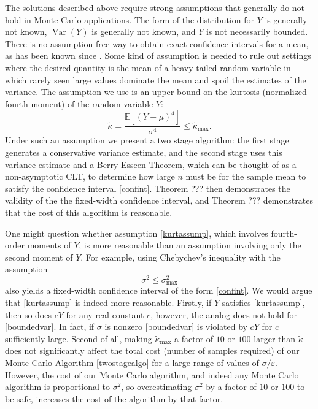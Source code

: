 \documentclass[graybox]{svmult}
\newcommand\e{\mathbb{E}}
\DeclareMathOperator{\var}{Var}
\newcommand{\tkappa}{\tilde{\kappa}}
\begin{document}
The solutions described above require strong assumptions that generally do not hold in Monte Carlo applications.  The form of the distribution for $Y$ is generally not known, $\var(Y)$ is generally not known, and $Y$ is not necessarily bounded.  There is no assumption-free way to obtain exact confidence intervals for a mean,
as has been known since \cite[Corollary 2]{BahSav56}. Some kind of assumption is needed to rule out settings where the desired quantity is the
mean of a heavy tailed random variable in which
rarely seen large values dominate the mean and spoil the estimates of the variance.
The assumption we use is an upper bound on
the kurtosis (normalized fourth moment) of the
random variable $Y$:
\begin{equation} \label{kurtassump}
\tkappa = \frac{\e[(Y-\mu)^4]}{\sigma^4} \le \tkappa_{\max}.
\end{equation}
Under such an assumption we present
a two stage algorithm: the first stage generates
a conservative variance estimate, and the second stage
uses this variance estimate and a Berry-Esseen Theorem, which can be thought of as a non-asymptotic CLT, to determine how large $n$ must be for the sample mean to satisfy the confidence interval \eqref{confint}.  Theorem ??? then demonstrates the validity of the the fixed-width confidence interval, and Theorem ??? demonstrates that the cost of this algorithm is reasonable.

One might question whether assumption \eqref{kurtassump}, which involves fourth-order moments of $Y$, is more reasonable than an assumption involving only the second moment of $Y$.  For example, using Chebychev's inequality with the assumption 
\begin{equation} \label{boundedvar}
\sigma^2 \le \sigma^2_{\max}
\end{equation}
also yields a fixed-width confidence interval of the form \eqref{confint}.  We would argue that \eqref{kurtassump} is indeed more reasonable.  Firstly, if $Y$ satisfies \eqref{kurtassump}, then so does $cY$ for any real constant $c$, however, the analog does not hold for \eqref{boundedvar}.  In fact, if $\sigma$ is nonzero \eqref{boundedvar} is violated by $cY$ for $c$ sufficiently large.  Second of all, making $\tkappa_{\max}$ a factor of $10$ or $100$ larger than $\tkappa$ does not significantly affect the total cost (number of samples required) of our Monte Carlo Algorithm \ref{twostagealgo} for a large range of values of $\sigma/\varepsilon$.  However, the cost of our Monte Carlo algorithm, and indeed any Monte Carlo algorithm is proportional to $\sigma^2$, so overestimating $\sigma^2$ by a factor of $10$ or $100$ to be safe, increases the cost of the algorithm by that factor. 
\end{document}
